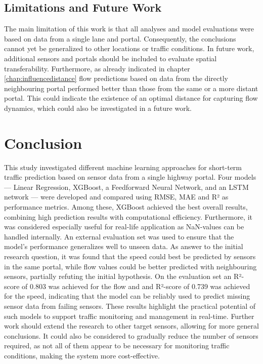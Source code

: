 	\subsection{Limitations and Future Work}
	The main limitation of this work is that all analyses and model evaluations were based on data from a single lane and portal. Consequently, the conclusions cannot yet be generalized to other locations or traffic conditions.
	In future work, additional sensors and portals should be included to evaluate spatial transferability.  \newline
	Furthermore, as already indicated in chapter \ref{chap:influencedistance} flow predictions based on data from the directly neighbouring portal performed better than those from the same or a more distant portal. This could indicate the existence of an optimal distance for capturing flow dynamics, which could also be investigated in a future work.
	
	\section{Conclusion}
	This study investigated different machine learning approaches for short-term traffic prediction based on sensor data from a single highway portal. Four models — Linear Regression, XGBoost, a Feedforward Neural Network, and an LSTM network — were developed and compared using RMSE, MAE and R² as performance metrics. Among these, XGBoost achieved the best overall results, combining high prediction results with computational efficiency. Furthermore, it was considered especially useful for real-life application as NaN-values can be handled internally. An external evaluation set was used to ensure that the model’s performance generalizes well to unseen data. \newline
	As answer to the initial research question, it was found that the speed could best be predicted by sensors in the same portal, while flow values could be better predicted with neighbouring sensors, partially refuting the initial hypothesis. On the evaluation set an R²-score of 0.803 was achieved for the flow and and R²-score of 0.739 was achieved for the speed, indicating that the model can be reliably used to predict missing sensor data from failing sensors. These results highlight the practical potential of such models to support traffic monitoring and management in real-time. Further work should extend the research to other target sensors, allowing for more general conclusions. It could also be considered to gradually reduce the number of sensors required, as not all of them appear to be necessary for monitoring traffic conditions, making the system more cost-effective.
	

